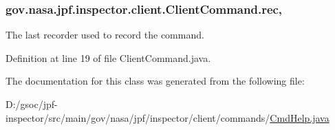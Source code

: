 \subsubsection[{\texorpdfstring{rec}{rec}}]{ gov.\+nasa.\+jpf.\+inspector.\+client.\+Client\+Command.\+rec\hspace{0.3cm}{\ttfamily [protected]}, {\ttfamily [inherited]}}\hypertarget{classgov_1_1nasa_1_1jpf_1_1inspector_1_1client_1_1_client_command_af4246f2427035c72a6af45a2c61361f7}{}\label{classgov_1_1nasa_1_1jpf_1_1inspector_1_1client_1_1_client_command_af4246f2427035c72a6af45a2c61361f7}


The last recorder used to record the command. 



Definition at line 19 of file Client\+Command.\+java.



The documentation for this class was generated from the following file\+:\begin{DoxyCompactItemize}
\item 
D\+:/gsoc/jpf-\/inspector/src/main/gov/nasa/jpf/inspector/client/commands/\hyperlink{_cmd_help_8java}{Cmd\+Help.\+java}\end{DoxyCompactItemize}
